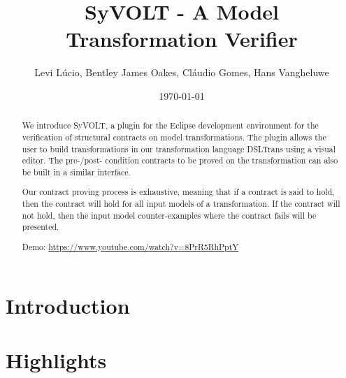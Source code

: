 \documentclass[conference]{IEEEtran}
\begin{document}
\title{SyVOLT - A Model Transformation Verifier}
\author{Levi L\'{u}cio, Bentley James Oakes, Cl\'{a}udio Gomes, Hans Vangheluwe}

\author{
	}

\date{\today}


\maketitle




\begin{abstract}


We introduce SyVOLT, a plugin for the Eclipse development environment for the verification of structural contracts on model transformations. The plugin allows the user to build transformations in our transformation language DSLTrans using a visual editor. The pre-/post- condition contracts to be proved on the transformation can also be built in a similar interface.

Our contract proving process is exhaustive, meaning that if a contract is said to hold, then the contract will hold for all input models of a transformation. If the contract will not hold, then the input model counter-examples where the contract fails will be presented.

Demo: \url{https://www.youtube.com/watch?v=8PrR5RhPptY}



\end{abstract}


\section{Introduction}
\label{sec:intro}


\section{Highlights}
\label{sec:highlights}

\end{document}
